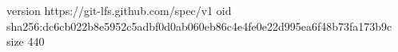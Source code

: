 version https://git-lfs.github.com/spec/v1
oid sha256:dc6cb022b8e5952c5adbf0d0ab060eb86c4e4fe0e22d995ea6f48b73fa173b9c
size 440
